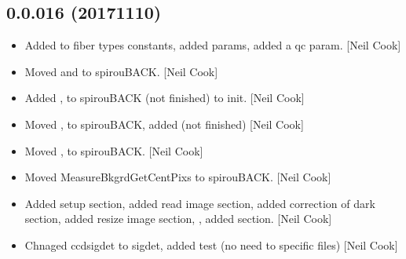 \documentclass[a4paper,10pt,english]{report}
\begin{document}
\subsection{0.0.016 (2017\sphinxhyphen{}11\sphinxhyphen{}10)}
\label{\detokenize{misc/changelog:id553}}\begin{itemize}
\item {} 
Added  to fiber types constants, added  params, added a
qc param. {[}Neil Cook{]}

\item {} 
Moved  and
 to spirouBACK. {[}Neil Cook{]}

\item {} 
Added , 
to spirouBACK  (not finished) to init.
{[}Neil Cook{]}

\item {} 
Moved , 
to spirouBACK, added  (not finished) {[}Neil
Cook{]}

\item {} 
Moved , 
to spirouBACK. {[}Neil Cook{]}

\item {} 
Moved MeasureBkgrdGetCentPixs to spirouBACK. {[}Neil Cook{]}

\item {} 
Added setup section, added read image section, added correction of
dark section, added resize image section, , added  section.
{[}Neil Cook{]}

\item {} 
Chnaged ccdsigdet to sigdet, added test (no need to specific files)
{[}Neil Cook{]}

\end{itemize}
\end{document}
